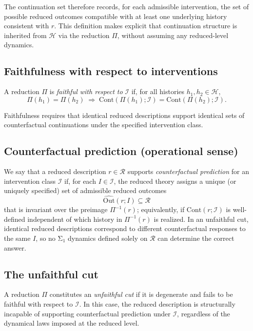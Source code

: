 The continuation set therefore records, for each admissible intervention, the set of
possible reduced outcomes compatible with at least one underlying history consistent
with $r$. This definition makes explicit that continuation structure is inherited from
$\mathcal{H}$ via the reduction $\Pi$, without assuming any reduced-level dynamics.

\subsection{Faithfulness with respect to interventions}

\begin{definition}[Faithfulness]
A reduction $\Pi$ is \emph{faithful with respect to} $\mathcal{I}$ if, for all histories
$h_1,h_2 \in \mathcal{H}$,
\begin{equation}
\Pi(h_1) = \Pi(h_2)
\;\Rightarrow\;
\mathrm{Cont}(\Pi(h_1);\mathcal{I})
=
\mathrm{Cont}(\Pi(h_2);\mathcal{I}).
\end{equation}
\end{definition}

Faithfulness requires that identical reduced descriptions support identical sets of
counterfactual continuations under the specified intervention class.

\subsection{Counterfactual prediction (operational sense)}

We say that a reduced description $r \in \mathcal{R}$ supports \emph{counterfactual prediction}
for an intervention class $\mathcal{I}$ if, for each $I \in \mathcal{I}$, the reduced theory
assigns a unique (or uniquely specified) set of admissible reduced outcomes
\begin{equation}
\widehat{\mathrm{Out}}(r;I) \subseteq \mathcal{R}
\end{equation}
that is invariant over the preimage $\Pi^{-1}(r)$; equivalently, if $\mathrm{Cont}(r;\mathcal{I})$
is well-defined independent of which history in $\Pi^{-1}(r)$ is realized. In an unfaithful cut,
identical reduced descriptions correspond to different counterfactual responses to the same $I$,
so no Σ$_1$ dynamics defined solely on $\mathcal{R}$ can determine the correct answer.

\subsection{The unfaithful cut}

A reduction $\Pi$ constitutes an \emph{unfaithful cut} if it is degenerate and fails to be
faithful with respect to $\mathcal{I}$. In this case, the reduced description is structurally
incapable of supporting counterfactual prediction under $\mathcal{I}$, regardless of the
dynamical laws imposed at the reduced level.